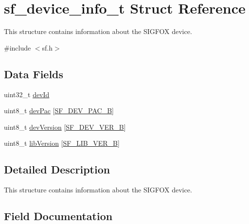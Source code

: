 \hypertarget{structsf__device__info__t}{}\section{sf\+\_\+device\+\_\+info\+\_\+t Struct Reference}
\label{structsf__device__info__t}


This structure contains information about the S\+I\+G\+F\+OX device.  




{\ttfamily \#include $<$sf.\+h$>$}

\subsection*{Data Fields}
\begin{DoxyCompactItemize}
\item 
uint32\+\_\+t \mbox{\hyperlink{structsf__device__info__t_aae63e69769874a78692e47f42d20242d}{dev\+Id}}
\item 
uint8\+\_\+t \mbox{\hyperlink{structsf__device__info__t_a83504145e622c48491257de6ace7761e}{dev\+Pac}} \mbox{[}\mbox{\hyperlink{sf__ol23xx_8h_af179cd7db055b975a8aa0543f469b4d3}{S\+F\+\_\+\+D\+E\+V\+\_\+\+P\+A\+C\+\_\+B}}\mbox{]}
\item 
uint8\+\_\+t \mbox{\hyperlink{structsf__device__info__t_ae65c4b66c765a2eea9d2984339445d2d}{dev\+Version}} \mbox{[}\mbox{\hyperlink{sf__ol23xx_8h_afe852c9108ff2e80bf25b89f18369d16}{S\+F\+\_\+\+D\+E\+V\+\_\+\+V\+E\+R\+\_\+B}}\mbox{]}
\item 
uint8\+\_\+t \mbox{\hyperlink{structsf__device__info__t_a9c77882aef65c6db0fa1630190bda1d8}{lib\+Version}} \mbox{[}\mbox{\hyperlink{sf__ol23xx_8h_a2aec070a7f1b02738f4fe63ce66c5e1d}{S\+F\+\_\+\+L\+I\+B\+\_\+\+V\+E\+R\+\_\+B}}\mbox{]}
\end{DoxyCompactItemize}


\subsection{Detailed Description}
This structure contains information about the S\+I\+G\+F\+OX device. 

\subsection{Field Documentation}
\mbox{\label{structsf__device__info__t_aae63e69769874a78692e47f42d20242d}} 
